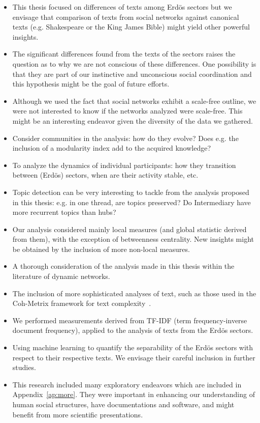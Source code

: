 \begin{itemize}
\item This thesis focused on differences of texts among Erd\"os sectors but we envisage that comparison of texts from social networks against canonical texts (e.g. Shakespeare or the King James Bible) might yield other powerful insights.
\item The significant differences found from the texts of the sectors raises the question as to why we are not conscious of these differences.
One possibility is that they are part of our instinctive and unconscious social coordination and this hypothesis might be the goal of future efforts.
\item Although we used the fact that social networks exhibit a scale-free outline,
	we were not interested to know if the networks analyzed were scale-free.
		This might be an interesting endeavor given the diversity of the data we gathered.
\item Consider communities in the analysis: how do they evolve? Does e.g. the inclusion of a modularity index add to the acquired knowledge?
\item To analyze the dynamics of individual participants: how they transition between (Erdös) sectors, when are their activity stable, etc.
\item Topic detection can be very interesting to tackle from the analysis proposed in this thesis:
	e.g. in one thread, are topics preserved? Do Intermediary have more recurrent topics than hubs?
\item Our analysis considered mainly local measures (and global statistic derived from them), with the exception of betweenness centrality.
	New insights might be obtained by the inclusion of more non-local measures.
\item A thorough consideration of the analysis made in this thesis within the literature of dynamic networks.
\item The inclusion of more sophisticated analyses of text, such as those used in the Coh-Metrix framework for text complexity~\cite{coh}.
\item We performed measurements derived from TF-IDF (term frequency-inverse document frequency),
	applied to the analysis of texts from the Erd\"os sectors.
\item Using machine learning to quantify the separability of the Erdös sectors with respect to their respective texts.
		We envisage their careful inclusion in further studies.
	\item This research included many exploratory endeavors which are included in Appendix~\ref{ap:more}.
		They were important in enhancing our understanding of human social structures,
		have documentations and software, and might benefit from more scientific presentations.


\end{itemize}
